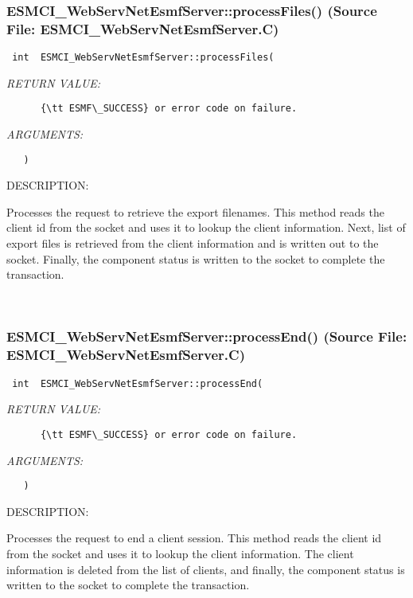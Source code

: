 \subsubsection{ESMCI\_WebServNetEsmfServer::processFiles() (Source File: ESMCI\_WebServNetEsmfServer.C)}


  
\begin{verbatim} int  ESMCI_WebServNetEsmfServer::processFiles(\end{verbatim}{\em RETURN VALUE:}
\begin{verbatim}      {\tt ESMF\_SUCCESS} or error code on failure.\end{verbatim}{\em ARGUMENTS:}
\begin{verbatim}   )\end{verbatim}
{\sf DESCRIPTION:\\ }


      Processes the request to retrieve the export filenames.  This method
      reads the client id from the socket and uses it to lookup the client
      information. Next, list of export files is retrieved from the client
      information and is written out to the socket.  Finally, the component
      status is written to the socket to complete the transaction.
   
 
\mbox{}\hrulefill\
 
\subsubsection{ESMCI\_WebServNetEsmfServer::processEnd() (Source File: ESMCI\_WebServNetEsmfServer.C)}


  
\begin{verbatim} int  ESMCI_WebServNetEsmfServer::processEnd(\end{verbatim}{\em RETURN VALUE:}
\begin{verbatim}      {\tt ESMF\_SUCCESS} or error code on failure.\end{verbatim}{\em ARGUMENTS:}
\begin{verbatim}   )\end{verbatim}
{\sf DESCRIPTION:\\ }


      Processes the request to end a client session.  This method reads the
      client id from the socket and uses it to lookup the client information.
      The client information is deleted from the list of clients, and finally,
      the component status is written to the socket to complete the
      transaction.
   
